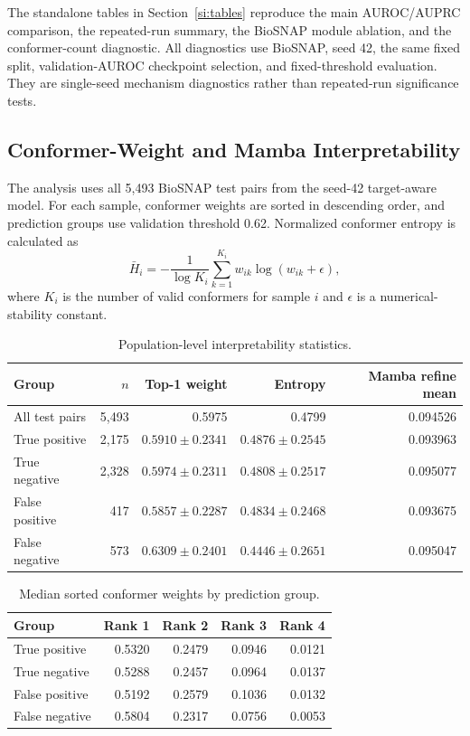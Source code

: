 The standalone tables in Section~\ref{si:tables} reproduce the main
AUROC/AUPRC comparison, the repeated-run summary, the BioSNAP module ablation,
and the conformer-count diagnostic. All diagnostics use BioSNAP, seed 42, the
same fixed split, validation-AUROC checkpoint selection, and fixed-threshold
evaluation. They are single-seed mechanism diagnostics rather than repeated-run
significance tests.

\subsection{Conformer-Weight and Mamba Interpretability}

The analysis uses all 5,493 BioSNAP test pairs from the seed-42 target-aware
model. For each sample, conformer weights are sorted in descending order, and
prediction groups use validation threshold 0.62. Normalized conformer entropy is
calculated as
\begin{equation}
\bar H_i=-\frac{1}{\log K_i}\sum_{k=1}^{K_i}w_{ik}\log(w_{ik}+\epsilon),
\end{equation}
where $K_i$ is the number of valid conformers for sample $i$ and $\epsilon$ is
a numerical-stability constant.

\begin{table}[!htbp]
\centering
\caption{Population-level interpretability statistics.}
\label{tab:si_interpretability_statistics}
\scriptsize
\setlength{\tabcolsep}{4pt}
\begin{tabular}{lrrrr}
\toprule
Group & $n$ & Top-1 weight & Entropy & Mamba refine mean \\
\midrule
All test pairs & 5,493 & 0.5975 & 0.4799 & 0.094526 \\
True positive & 2,175 & $0.5910\pm0.2341$ & $0.4876\pm0.2545$ & 0.093963 \\
True negative & 2,328 & $0.5974\pm0.2311$ & $0.4808\pm0.2517$ & 0.095077 \\
False positive & 417 & $0.5857\pm0.2287$ & $0.4834\pm0.2468$ & 0.093675 \\
False negative & 573 & $0.6309\pm0.2401$ & $0.4446\pm0.2651$ & 0.095047 \\
\bottomrule
\end{tabular}
\end{table}

\begin{table}[!htbp]
\centering
\caption{Median sorted conformer weights by prediction group.}
\label{tab:si_sorted_conformer_weights}
\begin{tabular}{lrrrr}
\toprule
Group & Rank 1 & Rank 2 & Rank 3 & Rank 4 \\
\midrule
True positive & 0.5320 & 0.2479 & 0.0946 & 0.0121 \\
True negative & 0.5288 & 0.2457 & 0.0964 & 0.0137 \\
False positive & 0.5192 & 0.2579 & 0.1036 & 0.0132 \\
False negative & 0.5804 & 0.2317 & 0.0756 & 0.0053 \\
\bottomrule
\end{tabular}
\end{table}

